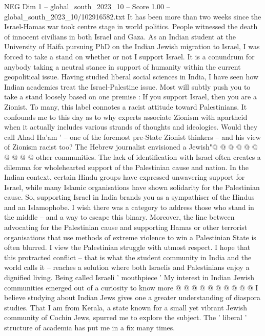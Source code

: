 \begin{textsample}{NEG Dim 1 – global\_south\_2023\_10 – Score 1.00 – global\_south\_2023\_10/102916582.txt}  \label{ex:f1_neg_266}
It has been more than two weeks since the Israel-Hamas war took centre stage in world politics.
People witnessed the death of innocent civilians in both Israel and Gaza.
As an Indian student at the University of Haifa pursuing PhD on the Indian Jewish migration to Israel, I was forced to take a stand on whether or not I support Israel.
It is a conundrum for anybody taking a neutral stance in support of humanity within the current geopolitical issue.
Having studied liberal social sciences in India, I have seen how Indian academics treat the Israel-Palestine issue.
Most will subtly push you to take a stand loosely based on one premise : If you support Israel, then you are a Zionist.
To many, this label connotes a racist attitude toward Palestinians.
It confounds me to this day as to why experts associate Zionism with apartheid when it actually includes various strands of thoughts and ideologies.
Would they call Ahad Ha'am ' -- one of the foremost pre-State Zionist thinkers -- and his view of Zionism racist too?
The Hebrew journalist envisioned a Jewish"@ @ @ @ @ @ @ @ @ @ other communities.
The lack of identification with Israel often creates a dilemma for wholehearted support of the Palestinian cause and nation.
In the Indian context, certain Hindu groups have expressed unwavering support for Israel, while many Islamic organisations have shown solidarity for the Palestinian cause.
So, supporting Israel in India brands you as a sympathiser of the Hindus and an Islamophobe.
I wish there was a category to address those who stand in the middle -- and a way to escape this binary.
Moreover, the line between advocating for the Palestinian cause and supporting Hamas or other terrorist organisations that use methods of extreme violence to win a Palestinian State is often blurred.
I view the Palestinian struggle with utmost respect.
I hope that this protracted conflict -- that is what the student community in India and the world calls it -- reaches a solution where both Israelis and Palestinians enjoy a dignified living.
Being called Israeli ' mouthpiece ' My interest in Indian Jewish communities emerged out of a curiosity to know more @ @ @ @ @ @ @ @ @ @ I believe studying about Indian Jews gives one a greater understanding of diaspora studies.
That I am from Kerala, a state known for a small yet vibrant Jewish community of Cochin Jews, spurred me to explore the subject.
The ' liberal ' structure of academia has put me in a fix many times.

\end{textsample}
